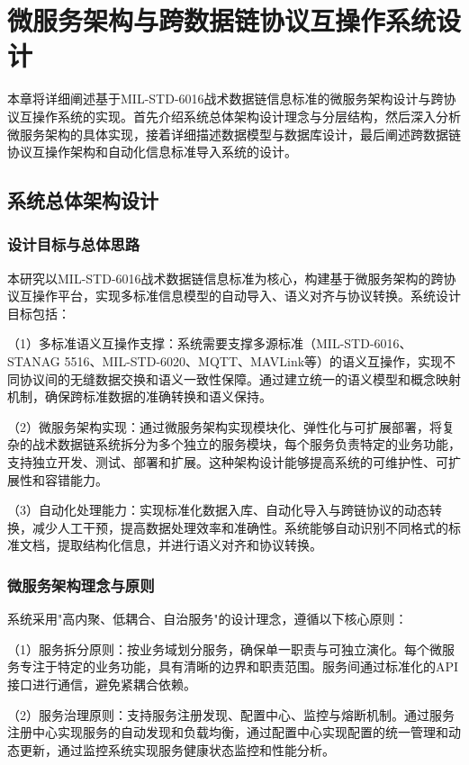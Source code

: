 \chapter{微服务架构与跨数据链协议互操作系统设计}

本章将详细阐述基于MIL-STD-6016战术数据链信息标准的微服务架构设计与跨协议互操作系统的实现。首先介绍系统总体架构设计理念与分层结构，然后深入分析微服务架构的具体实现，接着详细描述数据模型与数据库设计，最后阐述跨数据链协议互操作架构和自动化信息标准导入系统的设计。

\section{系统总体架构设计}

\subsection{设计目标与总体思路}

本研究以MIL-STD-6016战术数据链信息标准为核心，构建基于微服务架构的跨协议互操作平台，实现多标准信息模型的自动导入、语义对齐与协议转换。系统设计目标包括：

（1）多标准语义互操作支撑：系统需要支撑多源标准（MIL-STD-6016、STANAG 5516、MIL-STD-6020、MQTT、MAVLink等）的语义互操作，实现不同协议间的无缝数据交换和语义一致性保障。通过建立统一的语义模型和概念映射机制，确保跨标准数据的准确转换和语义保持。

（2）微服务架构实现：通过微服务架构实现模块化、弹性化与可扩展部署，将复杂的战术数据链系统拆分为多个独立的服务模块，每个服务负责特定的业务功能，支持独立开发、测试、部署和扩展。这种架构设计能够提高系统的可维护性、可扩展性和容错能力。

（3）自动化处理能力：实现标准化数据入库、自动化导入与跨链协议的动态转换，减少人工干预，提高数据处理效率和准确性。系统能够自动识别不同格式的标准文档，提取结构化信息，并进行语义对齐和协议转换。

\subsection{微服务架构理念与原则}

系统采用"高内聚、低耦合、自治服务"的设计理念，遵循以下核心原则：

（1）服务拆分原则：按业务域划分服务，确保单一职责与可独立演化。每个微服务专注于特定的业务功能，具有清晰的边界和职责范围。服务间通过标准化的API接口进行通信，避免紧耦合依赖。

（2）服务治理原则：支持服务注册发现、配置中心、监控与熔断机制。通过服务注册中心实现服务的自动发现和负载均衡，通过配置中心实现配置的统一管理和动态更新，通过监控系统实现服务健康状态监控和性能分析。

